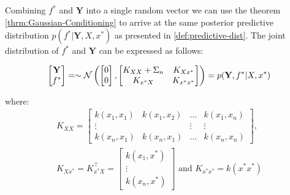 %


Combining $f^{\ast}$ and $\mathbf{Y}$ into a single random vector we can use the theorem \ref{thrm:Gaussian-Conditioning}
to arrive at the same posterior predictive distribution
$p(f^{\ast} | \mathbf{Y}, X, x^{\ast})$ as presented in \ref{def:predictive-dist}.
The joint distribution of $f^{\ast}$ and $\mathbf{Y}$ can be expressed as follows:

\begin{gather}
    \begin{bmatrix}
        \mathbf{Y} \\
        f^{\ast}
    \end{bmatrix} =
    \sim \operatorname{\mathcal{N}} \left(
        \begin{bmatrix}
        0 \\
        0
        \end{bmatrix},
        \begin{bmatrix}
        K_{XX} + \Sigma_n & K_{Xx^{\ast}} \\
        K_{x^{\ast}X} & K_{x^{\ast}x^{\ast}}
        \end{bmatrix}
        \right)
    = p(\mathbf{Y}, f^{\ast}| X, x^{\ast})
\end{gather}

where:
\begin{gather*}
    K_{XX} =
    \begin{bmatrix}
        k(x_1, x_1) & k(x_1, x_2) & \dots & k(x_1, x_n)\\
        \vdots  &  & \vdots  & \vdots \\
        k(x_n, x_1)  & k(x_n, x_1) & \dots  & k(x_n, x_n)
    \end{bmatrix}, \\
    K_{Xx^{\ast}} = K_{x^{\ast}X}^{\top} =
    \begin{bmatrix}
        k(x_1, x^{\ast}) \\
        \vdots \\
        k(x_n,  x^{\ast})
    \end{bmatrix} \text{ and }
    K_{x^{\ast}x^{\ast}} = k(x^{\ast}x^{\ast})
\end{gather*}

